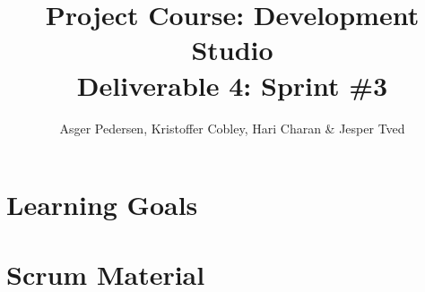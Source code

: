 \documentclass[]{article}
\title{ Project Course: Development Studio \\ Deliverable 4: Sprint \#3}
\author{ Asger Pedersen, Kristoffer Cobley, Hari Charan \& Jesper Tved }
\begin{document}
\ifpdf
{}
\else
{}
\fi

\maketitle
\setcounter{tocdepth}{1}
\tableofcontents
\newpage




\section{Learning Goals} %
\label{sec:Learning Goals}




\appendix
\section{Scrum Material} %
\label{sec:Scrum Material}

%
%



\end{document}
